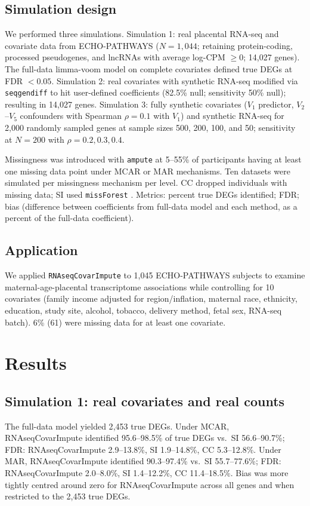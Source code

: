 \documentclass[11pt]{article}
\begin{document}
\subsection{Simulation design}
We performed three simulations. Simulation 1: real placental RNA-seq and covariate data from ECHO-PATHWAYS \citep{r5} ($N=1{,}044$; retaining protein-coding, processed pseudogenes, and lncRNAs with average log-CPM $\geq 0$; 14{,}027 genes). The full-data limma-voom model on complete covariates defined true DEGs at FDR $<0.05$. Simulation 2: real covariates with synthetic RNA-seq modified via \texttt{seqgendiff} \citep{r16} to hit user-defined coefficients (82.5\% null; sensitivity 50\% null); resulting in 14{,}027 genes. Simulation 3: fully synthetic covariates ($V_1$ predictor, $V_2$--$V_5$ confounders with Spearman $\rho=0.1$ with $V_1$) and synthetic RNA-seq for 2{,}000 randomly sampled genes at sample sizes 500, 200, 100, and 50; sensitivity at $N=200$ with $\rho=0.2, 0.3, 0.4$.

Missingness was introduced with \texttt{ampute} at 5--55\% of participants having at least one missing data point under MCAR or MAR mechanisms. Ten datasets were simulated per missingness mechanism per level. CC dropped individuals with missing data; SI used \texttt{missForest} \citep{r15}. Metrics: percent true DEGs identified; FDR; bias (difference between coefficients from full-data model and each method, as a percent of the full-data coefficient).

\subsection{Application}
We applied \texttt{RNAseqCovarImpute} to 1{,}045 ECHO-PATHWAYS subjects to examine maternal-age-placental transcriptome associations while controlling for 10 covariates (family income adjusted for region/inflation, maternal race, ethnicity, education, study site, alcohol, tobacco, delivery method, fetal sex, RNA-seq batch). 6\% (61) were missing data for at least one covariate.

\section{Results}
\subsection{Simulation 1: real covariates and real counts}
The full-data model yielded 2{,}453 true DEGs. Under MCAR, RNAseqCovarImpute identified 95.6--98.5\% of true DEGs vs.\ SI 56.6--90.7\%; FDR: RNAseqCovarImpute 2.9--13.8\%, SI 1.9--14.8\%, CC 5.3--12.8\%. Under MAR, RNAseqCovarImpute identified 90.3--97.4\% vs.\ SI 55.7--77.6\%; FDR: RNAseqCovarImpute 2.0--8.0\%, SI 1.4--12.2\%, CC 11.4--18.5\%. Bias was more tightly centred around zero for RNAseqCovarImpute across all genes and when restricted to the 2{,}453 true DEGs.
\end{document}
